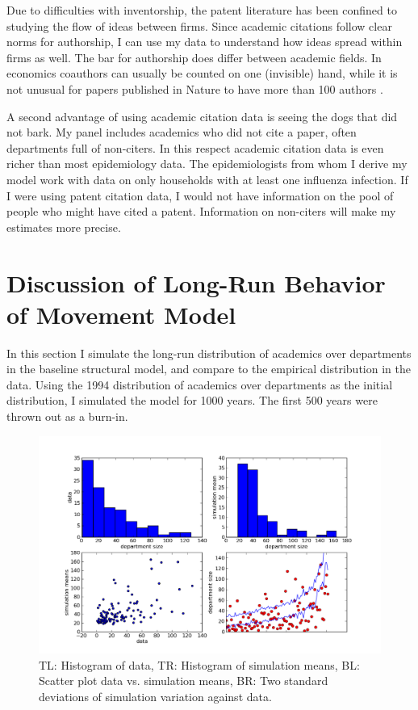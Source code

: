 \documentclass[]{article}
\makeatletter
\def\maxwidth{\ifdim\Gin@nat@width>\linewidth\linewidth
\else\Gin@nat@width\fi}
\let\Oldincludegraphics\includegraphics
\renewcommand{\includegraphics}[1]{\Oldincludegraphics[width=\maxwidth]{#1}}
\makeatother
\begin{document}
Due to difficulties with inventorship, the patent literature has been
confined to studying the flow of ideas between firms. Since academic
citations follow clear norms for authorship, I can use my data to
understand how ideas spread within firms as well. The bar for authorship
does differ between academic fields. In economics coauthors can usually
be counted on one (invisible) hand, while it is not unusual for papers
published in Nature to have more than 100 authors
\citep{greene2007demise}.

A second advantage of using academic citation data is seeing the dogs
that did not bark. My panel includes academics who did not cite a paper,
often departments full of non-citers. In this respect academic citation
data is even richer than most epidemiology data. The epidemiologists
from whom I derive my model work with data on only households with at
least one influenza infection. If I were using patent citation data, I
would not have information on the pool of people who might have cited a
patent. Information on non-citers will make my estimates more precise.

\section{Discussion of Long-Run Behavior of Movement Model}
\label{sec:movdists}

In this section I simulate the long-run distribution of academics over departments
in the baseline structural model, and compare to the empirical
distribution in the data.  Using the 1994 distribution of academics over departments
as the initial distribution, I simulated the model for 1000 years.  The first 500
years were thrown out as a burn-in.

\begin{figure}[h!]
    \centering
    \includegraphics{pics/mov_plts.png}
    \caption{TL: Histogram of data, TR: Histogram of simulation means, BL: Scatter plot data vs. simulation means, BR: Two standard deviations of simulation variation against data.}
    \label{fig:mov_plts}
\end{figure}
\end{document}
